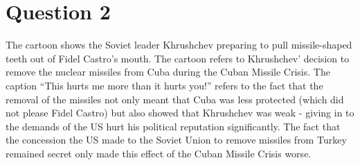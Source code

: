 \documentclass[11pt]{article}
\begin{document}
\section{Question 2}

The cartoon shows the Soviet leader Khrushchev preparing to pull missile-shaped teeth out of Fidel Castro's mouth. The cartoon refers to Khrushchev' decision to remove the nuclear missiles from Cuba during the Cuban Missile Crisis. The caption ``This hurts me more than it hurts you!'' refers to the fact that the removal of the missiles not only meant that Cuba was less protected (which did not please Fidel Castro) but also showed that Khrushchev was weak - giving in to the demands of the US hurt his political reputation significantly. The fact that the concession the US made to the Soviet Union to remove missiles from Turkey remained secret only made this effect of the Cuban Missile Crisis worse.
\end{document}
